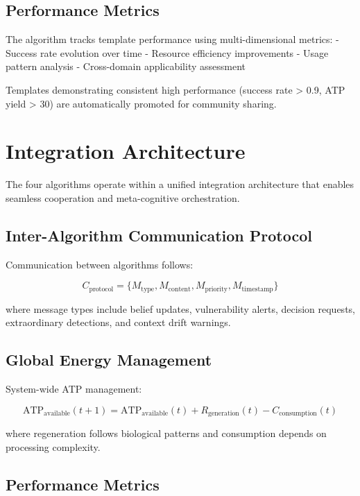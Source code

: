 \documentclass[12pt,a4paper]{article}
\begin{document}
\subsection{Performance Metrics}

The algorithm tracks template performance using multi-dimensional metrics:
- Success rate evolution over time
- Resource efficiency improvements
- Usage pattern analysis
- Cross-domain applicability assessment

Templates demonstrating consistent high performance (success rate > 0.9, ATP yield > 30) are automatically promoted for community sharing.

\section{Integration Architecture}

The four algorithms operate within a unified integration architecture that enables seamless cooperation and meta-cognitive orchestration.

\subsection{Inter-Algorithm Communication Protocol}

Communication between algorithms follows:

\begin{equation}
C_{\text{protocol}} = \{M_{\text{type}}, M_{\text{content}}, M_{\text{priority}}, M_{\text{timestamp}}\}
\end{equation}

where message types include belief updates, vulnerability alerts, decision requests, extraordinary detections, and context drift warnings.

\subsection{Global Energy Management}

System-wide ATP management:

\begin{equation}
\text{ATP}_{\text{available}}(t+1) = \text{ATP}_{\text{available}}(t) + R_{\text{generation}}(t) - C_{\text{consumption}}(t)
\end{equation}

where regeneration follows biological patterns and consumption depends on processing complexity.

\subsection{Performance Metrics}
\end{document}
